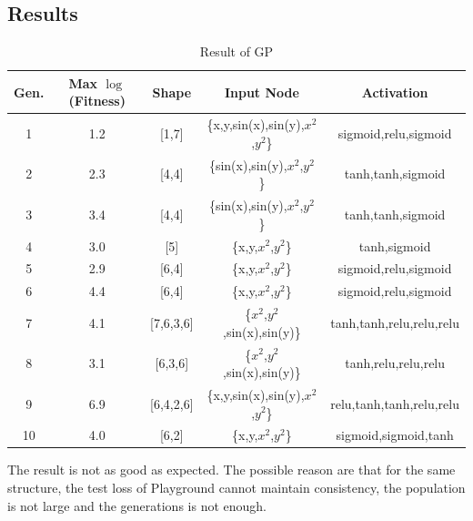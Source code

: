 \documentclass[12pt]{article}
\begin{document}
\subsection{Results}

\begin{table}[h]
\centering
\begin{tabular}{ccccc}
\toprule
Gen.  & Max $\log$(Fitness) & Shape & Input Node  &Activation \\ \midrule
1 & 1.2 & [1,7]&\{x,y,sin(x),sin(y),$x^2$,$y^2$\} &sigmoid,relu,sigmoid \\
2 & 2.3 & [4,4]&\{sin(x),sin(y),$x^2$,$y^2$\} &tanh,tanh,sigmoid  \\
3 & 3.4 & [4,4]&\{sin(x),sin(y),$x^2$,$y^2$\} &tanh,tanh,sigmoid  \\
4 & 3.0 & [5]&\{x,y,$x^2$,$y^2$\} &tanh,sigmoid   \\
5 & 2.9 & [6,4]&\{x,y,$x^2$,$y^2$\} &sigmoid,relu,sigmoid  \\
6 & 4.4 & [6,4]&\{x,y,$x^2$,$y^2$\}  &sigmoid,relu,sigmoid  \\
7 & 4.1 & [7,6,3,6]&\{$x^2$,$y^2$,sin(x),sin(y)\} &tanh,tanh,relu,relu,relu  \\
8 & 3.1 & [6,3,6]&\{$x^2$,$y^2$,sin(x),sin(y)\}&tanh,relu,relu,relu    \\
9 & 6.9 & [6,4,2,6]&\{x,y,sin(x),sin(y),$x^2$,$y^2$\}  &relu,tanh,tanh,relu,relu   \\
10 & 4.0 & [6,2]&\{x,y,$x^2$,$y^2$\}  &sigmoid,sigmoid,tanh  \\
\bottomrule
\end{tabular}
\caption{Result of GP}
\label{t_res}

\end{table}
The result is not as good as expected. The possible reason are that for the same structure, the test loss of Playground cannot maintain consistency, the population is not large and the generations is not enough.
\end{document}
